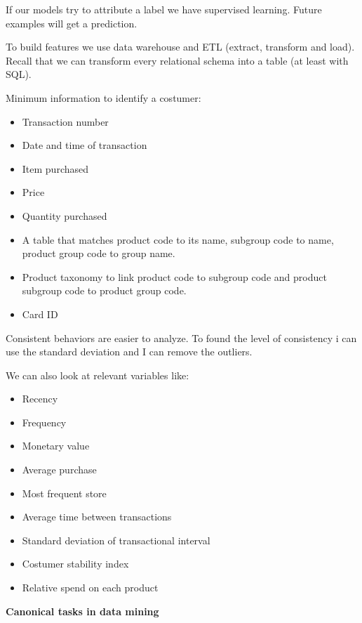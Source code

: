 If our models try to attribute a label we have supervised learning. Future examples will get a prediction.


\vspace{10pt}


To build features we use data warehouse and ETL (extract, transform and load). Recall that we can transform every relational schema into a table (at least with SQL).

\vspace{10 pt}

Minimum information to identify a costumer:
\begin{itemize}
    \item Transaction number
    \item Date and time of transaction
    \item Item purchased
    \item Price
    \item Quantity purchased
    \item A table that matches product code to its name, subgroup code to name, product group code to group name.
    \item Product taxonomy to link product code to subgroup code and product subgroup code to product group code.
    \item Card ID
\end{itemize}

Consistent behaviors are easier to analyze. To found the level of consistency i can use the standard deviation and I can remove the outliers.

\vspace{10pt}

We can also look at relevant variables like:
\begin{itemize}
    \item Recency
    \item Frequency
    \item Monetary value
    \item Average purchase
    \item Most frequent store
    \item Average time between transactions
    \item Standard deviation of transactional interval
    \item Costumer stability index
    \item Relative spend on each product
\end{itemize}

\textbf{Canonical tasks in data mining}


